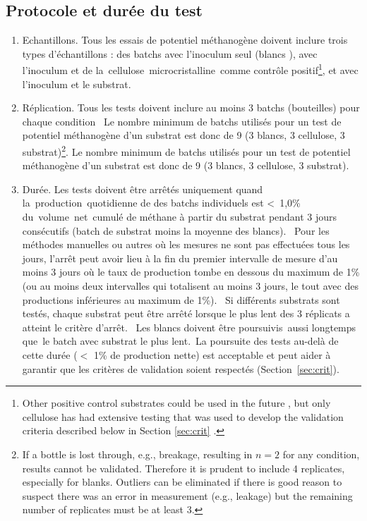 \documentclass[]{article}
\begin{document}
\subsection{Protocole et durée du test}
\label{sec:setup}
\begin{enumerate}
  \item Echantillons. 
    Tous les essais de potentiel méthanogène doivent inclure trois types d’échantillons : des batchs avec l’inoculum seul (\guillemotleft blancs \guillemotright), avec l’inoculum et de la cellulose microcristalline comme contrôle positif\footnote{
      Other positive control substrates could be used in the future \citep{kochEvaluationCommonSupermarket2020}, but only cellulose has had extensive testing that was used to develop the validation criteria described below in Section \ref{sec:crit} \citep{hafnerImprovingInterlaboratoryReproducibility2020}.
    }, et avec l’inoculum et le substrat.
    \item Réplication. 
Tous les tests doivent inclure au moins 3 batchs (bouteilles) pour chaque condition 
    Le nombre minimum de batchs utilisés pour un test de potentiel méthanogène d’un substrat est donc de 9 (3 blancs, 3 cellulose, 3 substrat)\footnote{
      If a bottle is lost through, e.g., breakage, resulting in $n=2$ for any condition, results cannot be validated.
      Therefore it is prudent to include 4 replicates, especially for blanks.
      Outliers can be eliminated if there is good reason to suspect there was an error in measurement (e.g., leakage) but the remaining number of replicates must be at least 3.
    }.
Le nombre minimum de batchs utilisés pour un test de potentiel méthanogène d’un substrat est donc de 9 (3 blancs, 3 cellulose, 3 substrat).
  \item Durée. 
    Les tests doivent être arrêtés uniquement quand la production quotidienne de  des batchs individuels est < 1,0\% du volume net cumulé de méthane à partir du substrat pendant 3 jours consécutifs (batch de substrat moins la moyenne des blancs).  
    Pour les méthodes manuelles ou autres où les mesures ne sont pas effectuées tous les jours, l’arrêt peut avoir lieu à la fin du premier intervalle de mesure d'au moins 3 jours où le taux de production tombe en dessous du maximum de 1\% (ou au moins deux intervalles qui totalisent au moins 3 jours, le tout avec des productions inférieures au maximum de 1\%). 
    Si différents substrats sont testés, chaque substrat peut être arrêté lorsque le plus lent des 3 réplicats a atteint le critère d’arrêt. 
    Les blancs doivent être poursuivis aussi longtemps que le batch avec substrat le plus lent. La poursuite des tests au-delà de cette durée ($<$ 1\% de production nette) est acceptable et peut aider à garantir que les critères de validation soient respectés (Section \ref{sec:crit}).
\end{enumerate}
\end{document}
